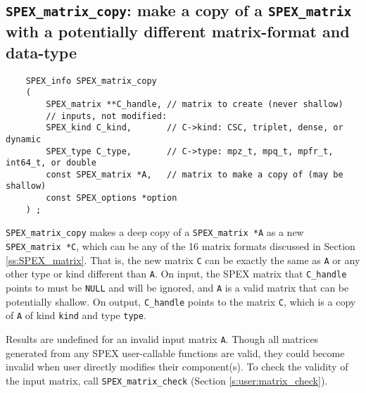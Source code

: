 \documentclass[12pt]{report}
\theoremstyle{definition}
\begin{document}
\subsection{\texttt{SPEX\_matrix\_copy}: make a copy of a \texttt{SPEX\_matrix} with a potentially different matrix-format and data-type}
\label{s:user:matrix_copy}

\begin{mdframed}[userdefinedwidth=6in]
{\footnotesize
\begin{verbatim}
    SPEX_info SPEX_matrix_copy
    (
        SPEX_matrix **C_handle, // matrix to create (never shallow)
        // inputs, not modified:
        SPEX_kind C_kind,       // C->kind: CSC, triplet, dense, or dynamic
        SPEX_type C_type,       // C->type: mpz_t, mpq_t, mpfr_t, int64_t, or double
        const SPEX_matrix *A,   // matrix to make a copy of (may be shallow)
        const SPEX_options *option
    ) ;
\end{verbatim}
} \end{mdframed}

\verb|SPEX_matrix_copy| makes a deep copy of a \verb|SPEX_matrix *A| as a new \verb|SPEX_matrix *C|, which can be any of the 16 matrix formats discussed in Section \ref{ss:SPEX_matrix}. That is, the new matrix \verb|C| can be exactly the same as \verb|A| or any other type or kind
different than \verb|A|.  On input, the SPEX matrix that \verb|C_handle| points to must be \verb|NULL| and will be ignored, and \verb|A| is a valid matrix that can be potentially shallow. On output, \verb|C_handle| points to the matrix
\verb|C|, which is a copy of \verb|A| of kind \verb|kind| and type \verb|type|. 


Results are undefined for an invalid input matrix \verb|A|. Though all matrices generated from any SPEX user-callable functions are valid, they could become invalid when user directly modifies their component(s). To check the validity of the input matrix, call
\verb|SPEX_matrix_check| (Section \ref{s:user:matrix_check}).

\end{document}

